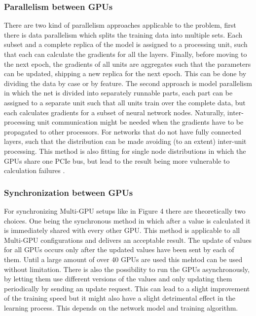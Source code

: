 \documentclass[conference]{IEEEtran}
\begin{document}
\subsubsection{Parallelism between GPUs}
There are two kind of parallelism approaches applicable to the problem, first there is data parallelism which splits the training data into multiple sets. Each subset and a complete replica of the model is assigned to a processing unit, such that each can calculate the gradients for all the layers. Finally, before moving to the next epoch, the gradients of all units are aggregates such that the parameters can be updated, shipping a new replica for the next epoch. This can be done by dividing the data by case or by feature. The second approach is model parallelism in which the net is divided into separately runnable parts, each part can be assigned to a separate unit such that all units train over the complete data, but each calculates gradients for a subset of neural network nodes. Naturally, inter-processing unit communication might be needed when the gradients have to be propagated to other processors. For networks that do not have fully connected layers, such that the distribution can be made avoiding (to an extent) inter-unit processing. This method is also fitting for single node distributions in which the GPUs share one PCIe bus, but lead to the result being more vulnerable to calculation failures \cite{sastre2017scalability}.

\subsubsection{Synchronization between GPUs}
For synchronizing Multi-GPU setups like in Figure 4 there are theoretically two choices. One being the synchronous method in which after a value is calculated it is immediately shared with every other GPU. This method is applicable to all Multi-GPU configurations and delivers an acceptable result\cite{wang2016deep}. The update of values for all GPUs occurs only after the updated values have been sent by each of them. Until a large amount of over 40 GPUs are used this mehtod can be used without limitation\cite{sastre2017scalability}. 
There is also the possibility to run the GPUs asynchronously, by letting them use different versions of the values and only updating them periodically by sending an update request. This can lead to a slight improvement of the training speed but it might also have a slight detrimental effect in the learning process\cite{wang2016deep}. This depends on the network model and training algorithm. 
\end{document}
